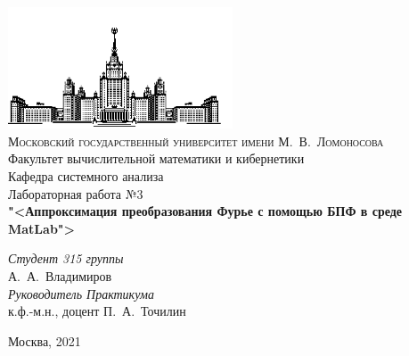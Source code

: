 \documentclass[oneside,final,11pt]{article}
\begin{document}
	\begin{titlepage}
		\begin{centering}
			\includegraphics[width=0.5\textwidth]{msu.png}\\
			{\scshape Московский государственный университет имени М.~В.~Ломоносова}\\
			Факультет вычислительной математики и кибернетики\\
			Кафедра системного анализа\\
			\vfill
			{\LARGE Лабораторная работа №3}\\
			\vspace{1cm}
			{\Huge\bfseries "<Аппроксимация преобразования Фурье с помощью БПФ в среде MatLab">\\}
		\end{centering}
		\vspace{1cm}
		\begin{flushright}
			\begin{large}
				{\itshape Студент 315 группы\\}
				А.~А.~Владимиров\\
				\vspace{5mm}
				{\itshape Руководитель Практикума\\}
				к.ф.-м.н., доцент П.~А.~Точилин\\
			\end{large}
		\end{flushright}
		\vfill
		\begin{centering}
			Москва, 2021\\ 
		\end{centering}
	\newpage
	\end{titlepage}

	\setcounter{page}{2}
\end{document}
